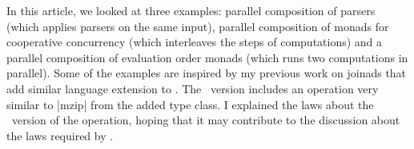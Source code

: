 \documentclass{tmr}
\begin{document}
In this article, we looked at three examples: parallel composition of parsers (which applies 
parsers on the same input), parallel composition of monads for cooperative concurrency (which interleaves
the steps of computations) and a parallel composition of evaluation order monads (which runs two 
computations in parallel). Some of the examples are inspired by my previous work on joinads that add 
similar language extension to \fsharp. The \fsharp \ version includes an operation very similar to 
|mzip| from the added  type class. I explained the laws about the \fsharp \ version of 
the operation, hoping that it may contribute to the discussion about the laws required by 
.


\end{document}
